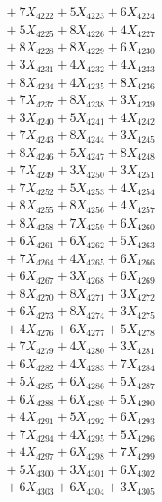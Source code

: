 \documentclass[a4paper,10pt]{article}
\begin{document}
{\begin{align}
&\;  + 7 X_{4222} + 5 X_{4223} + 6 X_{4224} \\[0.3ex]
&\;  + 5 X_{4225} + 8 X_{4226} + 4 X_{4227} \\[0.3ex]
&\;  + 8 X_{4228} + 8 X_{4229} + 6 X_{4230} \\[0.3ex]
&\;  + 3 X_{4231} + 4 X_{4232} + 4 X_{4233} \\[0.3ex]
&\;  + 8 X_{4234} + 4 X_{4235} + 8 X_{4236} \\[0.3ex]
&\;  + 7 X_{4237} + 8 X_{4238} + 3 X_{4239} \\[0.5ex]\allowbreak
&\;  + 3 X_{4240} + 5 X_{4241} + 4 X_{4242} \\[0.3ex]
&\;  + 7 X_{4243} + 8 X_{4244} + 3 X_{4245} \\[0.3ex]
&\;  + 8 X_{4246} + 5 X_{4247} + 8 X_{4248} \\[0.3ex]
&\;  + 7 X_{4249} + 3 X_{4250} + 3 X_{4251} \\[0.3ex]
&\;  + 7 X_{4252} + 5 X_{4253} + 4 X_{4254} \\[0.3ex]
&\;  + 8 X_{4255} + 8 X_{4256} + 4 X_{4257} \\[0.3ex]
&\;  + 8 X_{4258} + 7 X_{4259} + 6 X_{4260} \\[0.3ex]
&\;  + 6 X_{4261} + 6 X_{4262} + 5 X_{4263} \\[0.3ex]
&\;  + 7 X_{4264} + 4 X_{4265} + 6 X_{4266} \\[0.3ex]
&\;  + 6 X_{4267} + 3 X_{4268} + 6 X_{4269} \\[0.5ex]\allowbreak
&\;  + 8 X_{4270} + 8 X_{4271} + 3 X_{4272} \\[0.3ex]
&\;  + 6 X_{4273} + 8 X_{4274} + 3 X_{4275} \\[0.3ex]
&\;  + 4 X_{4276} + 6 X_{4277} + 5 X_{4278} \\[0.3ex]
&\;  + 7 X_{4279} + 4 X_{4280} + 3 X_{4281} \\[0.3ex]
&\;  + 6 X_{4282} + 4 X_{4283} + 7 X_{4284} \\[0.3ex]
&\;  + 5 X_{4285} + 6 X_{4286} + 5 X_{4287} \\[0.3ex]
&\;  + 6 X_{4288} + 6 X_{4289} + 5 X_{4290} \\[0.3ex]
&\;  + 4 X_{4291} + 5 X_{4292} + 6 X_{4293} \\[0.3ex]
&\;  + 7 X_{4294} + 4 X_{4295} + 5 X_{4296} \\[0.3ex]
&\;  + 4 X_{4297} + 6 X_{4298} + 7 X_{4299} \\[0.5ex]\allowbreak
&\;  + 5 X_{4300} + 3 X_{4301} + 6 X_{4302} \\[0.3ex]
&\;  + 6 X_{4303} + 6 X_{4304} + 3 X_{4305} \\[0.3ex]

\end{align}}
\end{document}
